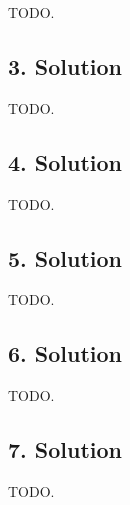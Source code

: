 TODO. 

\subsection{3. Solution}

TODO. 

\subsection{4. Solution}

TODO. 

\subsection{5. Solution}

TODO. 

\subsection{6. Solution}

TODO. 

\subsection{7. Solution}

TODO. 

